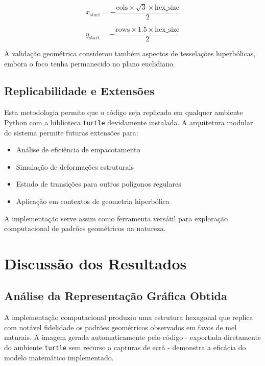 \documentclass[12pt,a4paper,oneside]{extarticle}
\begin{document}
\begin{equation}
x_{\text{start}} = -\frac{\text{cols} \times \sqrt{3} \times \text{hex\_size}}{2}
\end{equation}

\begin{equation}
y_{\text{start}} = -\frac{\text{rows} \times 1.5 \times \text{hex\_size}}{2}
\end{equation}

A validação geométrica considerou também aspectos de tesselações hiperbólicas, embora o foco tenha permanecido no plano euclidiano.

\subsection{Replicabilidade e Extensões}

Esta metodologia permite que o código seja replicado em qualquer ambiente Python com a biblioteca \texttt{turtle} devidamente instalada. A arquitetura modular do sistema permite futuras extensões para:
\begin{itemize}
    \item Análise de eficiência de empacotamento
    \item Simulação de deformações estruturais
    \item Estudo de transições para outros polígonos regulares
    \item Aplicação em contextos de geometria hiperbólica
\end{itemize}

A implementação serve assim como ferramenta versátil para exploração computacional de padrões geométricos na natureza.

\clearpage

\section{Discussão dos Resultados}

\subsection{Análise da Representação Gráfica Obtida}

A implementação computacional produziu uma estrutura hexagonal que replica com notável fidelidade os padrões geométricos observados em favos de mel naturais. A imagem gerada automaticamente pelo código - exportada diretamente do ambiente \texttt{turtle} sem recurso a capturas de ecrã - demonstra a eficácia do modelo matemático implementado.
\end{document}
